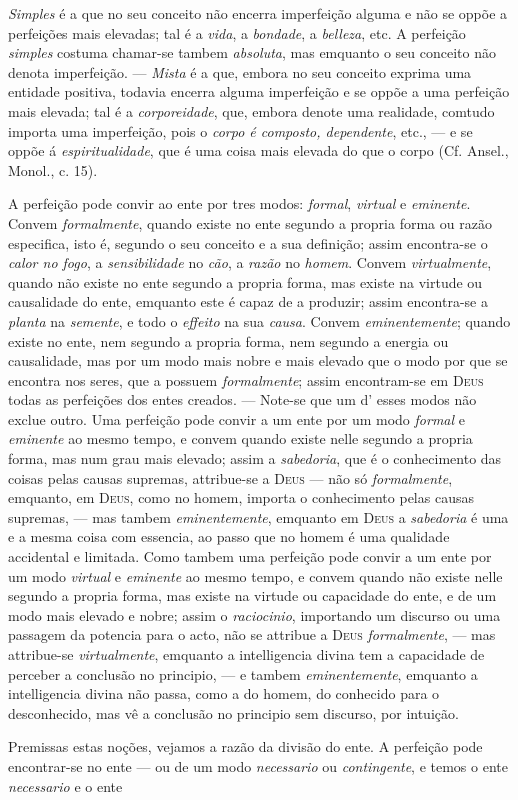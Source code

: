 \emph{Simples} é a que no seu conceito não encerra imperfeição alguma e não se oppõe a perfeições mais elevadas; tal é a \emph{vida}, a \emph{bondade}, a \emph{belleza}, etc. A perfeição \emph{simples} costuma chamar-se tambem \emph{absoluta}, mas emquanto o seu conceito não denota imperfeição. --- \emph{Mista} é a que, embora no seu conceito exprima uma entidade positiva, todavia encerra alguma imperfeição e se oppõe a uma perfeição mais elevada; tal é a \emph{corporeidade}, que, embora denote uma realidade, comtudo importa uma imperfeição, pois o \emph{corpo é composto, dependente}, etc., --- e se oppõe á \emph{espiritualidade}, que é uma coisa mais elevada do que o corpo (Cf. Ansel., Monol., c. 15).\par A perfeição pode convir ao ente por tres modos: \emph{formal}, \emph{virtual} e \emph{eminente}. Convem \emph{formalmente}, quando existe no ente segundo a propria forma ou razão especifica, isto é, segundo o seu conceito e a sua definição; assim encontra-se o \emph{calor no fogo}, a \emph{sensibilidade} no \emph{cão}, a \emph{razão} no \emph{homem}. Convem \emph{virtualmente}, quando não existe no ente segundo a propria forma, mas existe na virtude ou causalidade do ente, emquanto este é capaz de a produzir; assim encontra-se a \emph{planta} na \emph{semente}, e todo o \emph{effeito} na sua \emph{causa}. Convem \emph{eminentemente}; quando existe no ente, nem segundo a propria forma, nem segundo a energia ou causalidade, mas por um modo mais nobre e mais elevado que o modo por que se encontra nos seres, que a possuem \emph{formalmente}; assim encontram-se em \textsc{Deus} todas as perfeições dos entes creados. --- Note-se que um d' esses modos não exclue outro. Uma perfeição pode convir a um ente por um modo \emph{formal} e \emph{eminente} ao mesmo tempo, e convem quando existe nelle segundo a propria forma, mas num grau mais elevado; assim a \emph{sabedoria}, que é o conhecimento das coisas pelas causas supremas, attribue-se a \textsc{Deus} --- não só \emph{formalmente}, emquanto, em \textsc{Deus}, como no homem, importa o conhecimento pelas causas supremas, --- mas tambem \emph{eminentemente}, emquanto em \textsc{Deus} a \emph{sabedoria} é uma e a mesma coisa com essencia, ao passo que no homem é uma qualidade accidental e limitada. Como tambem uma perfeição pode convir a um ente por um modo \emph{virtual} e \emph{eminente} ao mesmo tempo, e convem quando não existe nelle segundo a propria forma, mas existe na virtude ou capacidade do ente, e de um modo mais elevado e nobre; assim o \emph{raciocinio}, importando um discurso ou uma passagem da potencia para o acto, não se attribue a \textsc{Deus} \emph{formalmente}, --- mas attribue-se \emph{virtualmente}, emquanto a intelligencia divina tem a capacidade de perceber a conclusão no principio, --- e tambem \emph{eminentemente}, emquanto a intelligencia divina não passa, como a do homem, do conhecido para o desconhecido, mas vê a conclusão no principio sem discurso, por intuição.\par Premissas estas noções, vejamos a razão da divisão do ente. A perfeição pode encontrar-se no ente --- ou de um modo \emph{necessario} ou \emph{contingente}, e temos o ente \emph{necessario} e o ente 